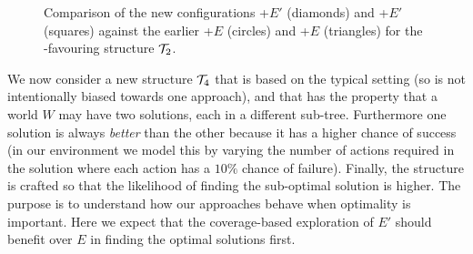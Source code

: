 \begin{figure}[ht]
\centering
{}
\caption{Comparison of the new configurations \BUL+$E'$ (diamonds) and \CL+$E'$ (squares) against the earlier \BUL+$E$ (circles) and \CL+$E$ (triangles) for the \BUL-favouring structure ${\mathcal{T}}_2$.}
\label{fig:T2_result2}
\end{figure}

We now consider a new structure ${\mathcal{T}}_4$ that is based on the typical setting (so is not intentionally biased towards one approach), and that has the property that a world $W$ may have two solutions, each in a different sub-tree. Furthermore one solution is always \textit{better} than the other because it has a higher chance of success (in our environment we model this by varying the number of actions required in the solution where each action has a $10\%$ chance of failure). Finally, the structure is crafted so that the likelihood of finding the sub-optimal solution is higher. The purpose is to understand how our approaches behave when optimality is important. Here we expect that the coverage-based exploration of $E'$ should benefit over $E$ in finding the optimal solutions first. 


